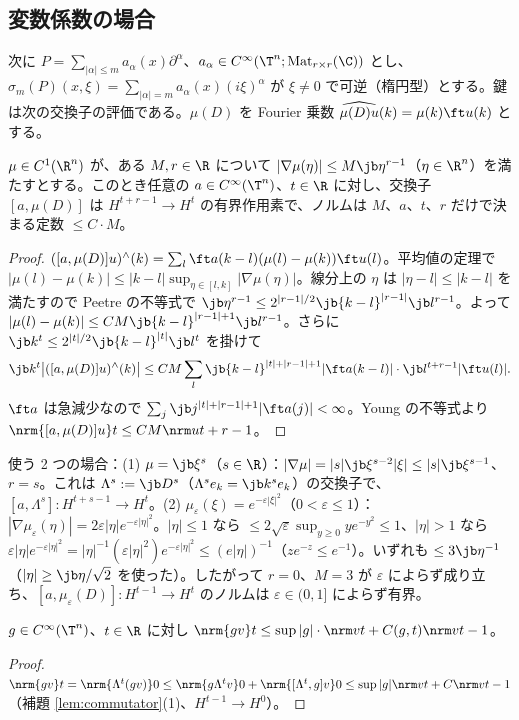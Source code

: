 \subsection{変数係数の場合}
次に $P=\sum_{|\alpha|\le m}a_\alpha(x)\partial^\alpha$、$a_\alpha\in C^\infty(\T^n;\mathrm{Mat}_{r\times r}(\C))$ とし、$\sigma_m(P)(x,\xi)=\sum_{|\alpha|=m}a_\alpha(x)(i\xi)^\alpha$ が $\xi\ne0$ で可逆（楕円型）とする。鍵は次の交換子の評価である。$\mu(D)$ を Fourier 乗数 $\widehat{\mu(D)u}(k)=\mu(k)\ft u(k)$ とする。
\begin{lem}[交換子の補題]\label{lem:commutator}\tP
$\mu\in C^1(\R^n)$ が、ある $M,r\in\R$ について $|\nabla\mu(\eta)|\le M\jb\eta^{r-1}$（$\eta\in\R^n$）を満たすとする。このとき任意の $a\in C^\infty(\T^n)$、$t\in\R$ に対し、交換子 $[a,\mu(D)]$ は $H^{t+r-1}\to H^t$ の有界作用素で、ノルムは $M$、$a$、$t$、$r$ だけで決まる定数 $\le C\cdot M$。
\end{lem}
\begin{proof}
$([a,\mu(D)]u)^\wedge(k)=\sum_l\ft a(k-l)(\mu(l)-\mu(k))\ft u(l)$。平均値の定理で $|\mu(l)-\mu(k)|\le|k-l|\sup_{\eta\in[l,k]}|\nabla\mu(\eta)|$。線分上の $\eta$ は $|\eta-l|\le|k-l|$ を満たすので Peetre の不等式で $\jb\eta^{r-1}\le2^{|r-1|/2}\jb{k-l}^{|r-1|}\jb l^{r-1}$。よって $|\mu(l)-\mu(k)|\le CM\jb{k-l}^{|r-1|+1}\jb l^{r-1}$。さらに $\jb k^t\le2^{|t|/2}\jb{k-l}^{|t|}\jb l^t$ を掛けて
\[
\jb k^t\bigl|([a,\mu(D)]u)^\wedge(k)\bigr|\le CM\sum_l\jb{k-l}^{|t|+|r-1|+1}|\ft a(k-l)|\cdot\jb l^{t+r-1}|\ft u(l)|.
\]
$\ft a$ は急減少なので $\sum_j\jb j^{|t|+|r-1|+1}|\ft a(j)|<\infty$。Young の不等式より $\nrm{[a,\mu(D)]u}t\le CM\nrm u{t+r-1}$。
\end{proof}
\noindent 使う 2 つの場合：(1) $\mu=\jb\xi^s$（$s\in\R$）：$|\nabla\mu|=|s|\jb\xi^{s-2}|\xi|\le|s|\jb\xi^{s-1}$、$r=s$。これは $\Lambda^s:=\jb D^s$（$\Lambda^se_k=\jb k^se_k$）の交換子で、$[a,\Lambda^s]:H^{t+s-1}\to H^t$。(2) $\mu_\varepsilon(\xi)=e^{-\varepsilon|\xi|^2}$（$0<\varepsilon\le1$）：$|\nabla\mu_\varepsilon(\eta)|=2\varepsilon|\eta|e^{-\varepsilon|\eta|^2}$。$|\eta|\le1$ なら $\le2\sqrt\varepsilon\sup_{y\ge0}ye^{-y^2}\le1$、$|\eta|>1$ なら $\varepsilon|\eta|e^{-\varepsilon|\eta|^2}=|\eta|^{-1}(\varepsilon|\eta|^2)e^{-\varepsilon|\eta|^2}\le(e|\eta|)^{-1}$（$ze^{-z}\le e^{-1}$）。いずれも $\le3\jb\eta^{-1}$（$|\eta|\ge\jb\eta/\sqrt2$ を使った）。したがって $r=0$、$M=3$ が $\varepsilon$ によらず成り立ち、$[a,\mu_\varepsilon(D)]:H^{t-1}\to H^t$ のノルムは $\varepsilon\in(0,1]$ によらず有界。

\begin{lem}\label{lem:gabs}\tP
$g\in C^\infty(\T^n)$、$t\in\R$ に対し $\nrm{gv}t\le\sup|g|\cdot\nrm vt+C(g,t)\nrm v{t-1}$。
\end{lem}
\begin{proof}
$\nrm{gv}t=\nrm{\Lambda^t(gv)}0\le\nrm{g\Lambda^tv}0+\nrm{[\Lambda^t,g]v}0\le\sup|g|\nrm vt+C\nrm v{t-1}$（補題 \ref{lem:commutator}(1)、$H^{t-1}\to H^0$）。
\end{proof}

